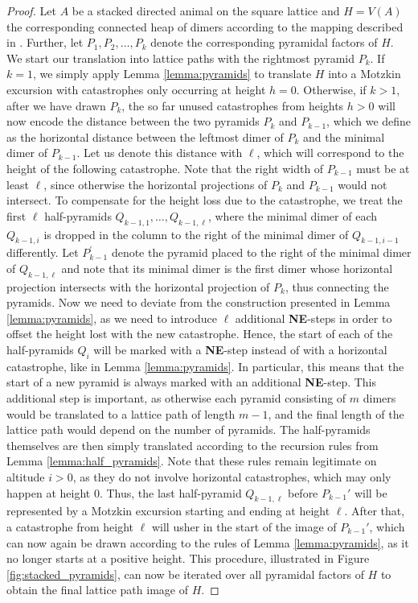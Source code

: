 \documentclass{article}
\theoremstyle{definition}
\begin{document}
\Bijection*

\begin{proof}
  Let $A$ be a stacked directed animal on the square lattice and $H = V(A)$ the corresponding connected heap of dimers according to the mapping described in .
  Further, let $P_1,P_2,\dots,P_k$ denote the corresponding pyramidal factors of $H$. We start our translation into lattice paths with the rightmost pyramid $P_k$. If $k = 1$, we simply apply Lemma \ref{lemma:pyramids} to translate $H$ into a Motzkin excursion with catastrophes only occurring at height $h = 0$.
Otherwise, if $k > 1$, after we have drawn $P_k$,
the so far unused catastrophes from heights $h > 0$ will now encode the distance between the two pyramids $P_k$ and $P_{k-1}$, which we define as the horizontal distance between the leftmost dimer of $P_k$ and the minimal dimer of $P_{k-1}$.
Let us denote this distance with $\ell$, which will correspond to the height of the following catastrophe. 
Note that the right width of $P_{k-1}$ must be at least $\ell$, since otherwise the horizontal projections of $P_k$ and $P_{k-1}$ would not intersect. To compensate for the height loss due to the catastrophe, we treat the first $\ell$ half-pyramids $Q_{k-1,1},\dots,Q_{k-1,\ell}$, where the minimal dimer of each $Q_{k-1,i}$ is dropped in the column to the right of the minimal dimer of $Q_{k-1,i-1}$ differently. Let $P_{k-1}^\prime$ denote the pyramid placed to the right of the minimal dimer of $Q_{k-1,\ell}$ and note that its minimal dimer is the first dimer whose horizontal projection intersects with the horizontal projection of $P_k$, thus connecting the pyramids.
Now we need to deviate from the construction presented in Lemma \ref{lemma:pyramids}, as we need to introduce $\ell$ additional \textbf{NE}-steps in order to offset the height lost with the new catastrophe. 
Hence, the start of each of the half-pyramids $Q_i$ will be marked with a \textbf{NE}-step instead of with a horizontal catastrophe, like in Lemma \ref{lemma:pyramids}. 
In particular, this means that the start of a new pyramid is always marked with an additional \textbf{NE}-step. 
This additional step is important, as otherwise each pyramid consisting of $m$ dimers would be translated to a lattice path of length $m - 1$, and the final length of the lattice path would depend on the number of pyramids.
The half-pyramids themselves are then simply translated according to the recursion rules from Lemma \ref{lemma:half_pyramids}. 
Note that these rules remain legitimate on altitude $i > 0$, as they do not involve horizontal catastrophes, which may only happen at height $0$.
Thus, the last half-pyramid $Q_{k-1,\ell}$ before $P_{k-1}'$ will be represented by a Motzkin excursion starting and ending at height $\ell$. 
After that, a catastrophe from height $\ell$ will usher in the start of the image of $P_{k-1}'$, which can now again be drawn according to the rules of Lemma \ref{lemma:pyramids}, as it no longer starts at a positive height.
This procedure, illustrated in Figure \ref{fig:stacked_pyramids}, can now be iterated over all pyramidal factors of $H$ to obtain the final lattice path image of $H$.


\end{proof}
\end{document}
